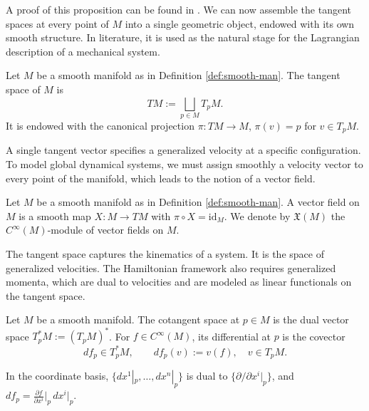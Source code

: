 A proof of this proposition can be found in \cite[Proposition 3.15]{leeIntroductionSmoothManifolds2013}. We can now assemble the tangent spaces at every point of $M$ into a single geometric object, endowed with its own smooth structure. In literature, it is used as the natural stage for the Lagrangian description of a mechanical system.

\begin{definition}\label{def:tan-space}
	Let $M$ be a smooth manifold as in Definition \ref{def:smooth-man}. The tangent space of $M$ is
	\[
	TM := \bigsqcup_{p \in M} T_pM.
	\]
	It is endowed with the canonical projection $\pi: TM \to M$, $\pi(v) = p$ for $v \in T_pM$. 
	
\end{definition}

A single tangent vector specifies a generalized velocity at a specific configuration. To model global dynamical systems, we must assign smoothly a velocity vector to every point of the manifold, which leads to the notion of a vector field.

\begin{definition}\label{def:vector-field}
	Let $M$ be a smooth manifold as in Definition \ref{def:smooth-man}. A vector field on $M$ is a smooth map $X: M \to TM$ with $\pi \circ X = \mathrm{id}_M$. We denote by $\mathfrak{X}(M)$ the $C^\infty(M)$-module of vector fields on $M$.
\end{definition}

The tangent space captures the kinematics of a system. It is the space of generalized velocities. The Hamiltonian framework also requires generalized momenta, which are dual to velocities and are modeled as linear functionals on the tangent space.

\begin{definition}[Covector]\label{def:covector}
	Let $M$ be a smooth manifold. The cotangent space at $p \in M$ is the dual vector space $T_p^*M := (T_pM)^*$. For $f \in C^\infty(M)$, its differential at $p$ is the covector
	\[
	df_p \in T_p^*M, \qquad df_p(v) := v(f), \quad v \in T_pM.
	\]
\end{definition}

\begin{remark}\label{def:dual-basis}
	In the coordinate basis, $\{dx^1|_p,\dots,dx^n|_p\}$ is dual to $\{\partial/\partial x^i|_p\}$, and $df_p = \frac{\partial f}{\partial x^i}\Big|_p\, dx^i|_p$.
\end{remark}


